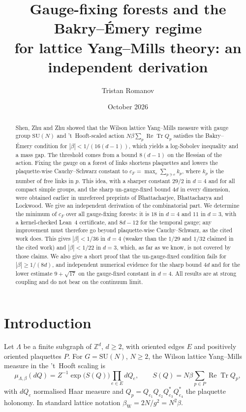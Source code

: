 \documentclass[11pt]{amsart}
\theoremstyle{definition}
\theoremstyle{remark}
\newcommand{\Tr}{\operatorname{Tr}}
\renewcommand{\Re}{\operatorname{Re}}
\newcommand{\SU}{\mathrm{SU}}
\begin{document}
\title[Gauge-fixing forests and the Bakry--\'Emery regime]{Gauge-fixing forests and the Bakry--\'Emery regime\\ for lattice Yang--Mills theory: an independent derivation}
\author{Tristan Romanov}
\date{October 2026}

\begin{abstract}
Shen, Zhu and Zhu showed that the Wilson lattice Yang--Mills measure with gauge group $\SU(N)$ and 't~Hooft-scaled
action $N\beta\sum_p\Re\Tr Q_p$ satisfies the Bakry--\'Emery condition for $|\beta|<1/(16(d-1))$, which yields a
log-Sobolev inequality and a mass gap. The threshold comes from a bound $8(d-1)$ on the Hessian of the action. Fixing
the gauge on a forest of links shortens plaquettes and lowers the plaquette-wise Cauchy--Schwarz constant to
$c_F=\max_e\sum_{p\ni e}k_p$, where $k_p$ is the number of free links in $p$. This idea, with a sharper constant
$29/2$ in $d=4$ and for all compact simple groups, and the sharp un-gauge-fixed bound $4d$ in every dimension, were
obtained earlier in unrefereed preprints of Bhattacharjee, Bhattacharya and Lockwood. We give an independent
derivation of the combinatorial part. We determine the minimum of $c_F$ over all gauge-fixing forests: it is $18$ in
$d=4$ and $11$ in $d=3$, with a kernel-checked Lean~4 certificate, and $8d-12$ for the temporal gauge; any improvement
must therefore go beyond plaquette-wise Cauchy--Schwarz, as the cited work does. This gives $|\beta|<1/36$ in $d=4$
(weaker than the $1/29$ and $1/32$ claimed in the cited work) and $|\beta|<1/22$ in $d=3$, which, as far as we know,
is not covered by those claims. We also give a short proof that the un-gauge-fixed condition fails for
$|\beta|\ge 1/(8d)$, and independent numerical evidence for the sharp bound $4d$ and for the lower estimate
$9+\sqrt{17}$ on the gauge-fixed constant in $d=4$. All results are at strong coupling and do not bear on the
continuum limit.
\end{abstract}

\maketitle

\section{Introduction}

Let $\Lambda$ be a finite subgraph of $\mathbb{Z}^d$, $d\ge2$, with oriented edges $E$ and positively oriented plaquettes
$P$. For $G=\SU(N)$, $N\ge2$, the Wilson lattice Yang--Mills measure in the 't~Hooft scaling is
\begin{equation}\label{eq:measure}
\mu_{\Lambda,\beta}(dQ)=Z^{-1}\exp\big(S(Q)\big)\prod_{e\in E}dQ_e,\qquad S(Q)=N\beta\sum_{p\in P}\Re\Tr Q_p ,
\end{equation}
with $dQ_e$ normalised Haar measure and $Q_p=Q_{e_1}Q_{e_2}Q_{e_3}^{*}Q_{e_4}^{*}$ the plaquette holonomy. In standard
lattice notation $\beta_{\mathrm{W}}=2N/g^2=N^2\beta$.
\end{document}
